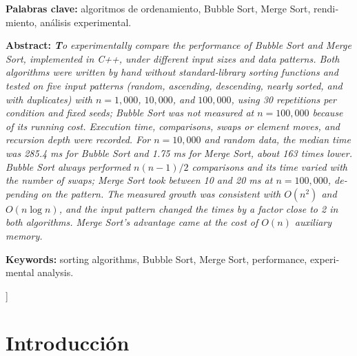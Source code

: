 \documentclass[12pt,a4paper,twocolumn]{article}
\begin{document}
{\begin{otherlanguage}{spanish}
{\vspace{0.15cm}
 
\noindent\textbf{Palabras clave:}
algoritmos de ordenamiento, Bubble Sort, Merge Sort,
rendimiento, análisis experimental.
 
}
\end{otherlanguage}
 
\vspace{0.3cm}
 
\begin{otherlanguage}{english}
{\fontsize{11}{13}\selectfont
 
\noindent\textbf{Abstract:}
\textit{\textbf To experimentally compare the performance of
Bubble Sort and Merge Sort, implemented in C++, under different input sizes
and data patterns. Both algorithms were written by hand
without standard-library sorting functions and tested on five input patterns
(random, ascending, descending, nearly sorted, and with duplicates) with
$n = 1{,}000$, $10{,}000$, and $100{,}000$, using 30 repetitions per condition
and fixed seeds; Bubble Sort was not measured at $n = 100{,}000$ because of its
running cost. Execution time, comparisons, swaps or element moves, and
recursion depth were recorded. For $n = 10{,}000$ and random
data, the median time was 285.4 ms for Bubble Sort and 1.75 ms for Merge Sort,
about 163 times lower. Bubble Sort always performed $n(n-1)/2$ comparisons and
its time varied with the number of swaps; Merge Sort took between 10 and 20 ms
at $n = 100{,}000$, depending on the pattern. The measured growth was consistent with $O(n^2)$ and $O(n\log n)$, and the input pattern changed the times by a factor close to 2 in both algorithms. Merge Sort's advantage came at the cost of $O(n)$ auxiliary memory.}
 
\vspace{0.15cm}
 
\noindent\textbf{Keywords:}
sorting algorithms, Bubble Sort, Merge Sort,
performance, experimental analysis.
 
}
\end{otherlanguage}
 
\vspace{0.5cm}
}]
 
 
\section{Introducción}
 
\end{document}
